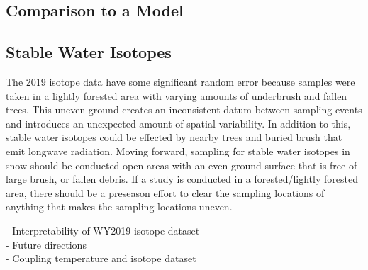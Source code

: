 \subsection{Comparison to a Model}

\subsection{Stable Water Isotopes}
The 2019 isotope data have some significant random error because samples were taken in a lightly forested area with varying amounts of underbrush and fallen trees. This uneven ground creates an inconsistent datum between sampling events and introduces an unexpected amount of spatial variability. In addition to this, stable water isotopes could be effected by nearby trees and buried brush that emit longwave radiation. Moving forward, sampling for stable water isotopes in snow should be conducted open areas with an even ground surface that is free of large brush, or fallen debris. If a study is conducted in a forested/lightly forested area, there should be a preseason effort to clear the sampling locations of anything that makes the sampling locations uneven. 

- Interpretability of WY2019 isotope dataset \\
- Future directions  \\
- Coupling temperature and isotope dataset \\
